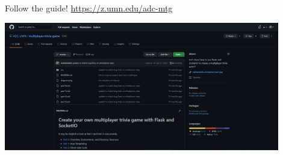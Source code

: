 \documentclass{beamer}
\begin{document}
\begin{frame}{Follow the guide!}
	\centering
	\href{https://z.umn.edu/adc-mtg}{https://z.umn.edu/adc-mtg}

	\bigskip

	\includegraphics[width=0.9\textwidth]{figs/guide.png}
\end{frame}
\end{document}

